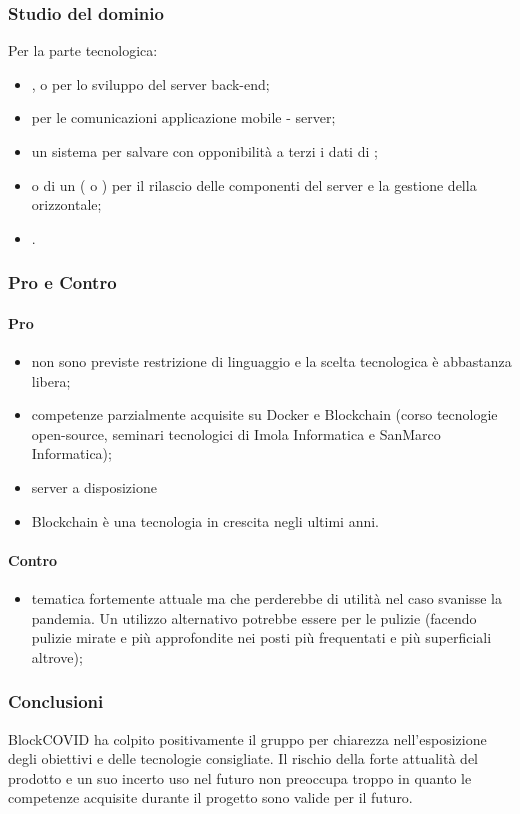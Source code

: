 \subsubsection{Studio del dominio}
Per la parte tecnologica:
\begin{itemize}
\item {},  o  per lo sviluppo del server back-end;
\item {}  per le comunicazioni applicazione mobile - server;
\item un sistema  per salvare con opponibilità a terzi i dati di ;
\item {} o di un  ( o ) per il rilascio delle componenti del server e la gestione della  orizzontale;
\item {}.
\end{itemize}
\subsubsection{Pro e Contro}
\paragraph*{Pro}
\begin{itemize}
	\item non sono previste restrizione di linguaggio e la scelta tecnologica è abbastanza libera;
	\item competenze parzialmente acquisite su Docker e Blockchain (corso tecnologie open-source, seminari tecnologici di Imola Informatica e SanMarco Informatica);
	\item server a disposizione 
	\item Blockchain è una tecnologia in crescita negli ultimi anni.
\end{itemize}
\paragraph*{Contro}
\begin{itemize}
	\item tematica fortemente attuale ma che perderebbe di utilità nel caso svanisse la pandemia. Un utilizzo alternativo potrebbe essere per le pulizie (facendo pulizie mirate e più approfondite nei posti più frequentati e più superficiali altrove);
\end{itemize}
\subsubsection{Conclusioni}
BlockCOVID ha colpito positivamente il gruppo per chiarezza nell'esposizione degli obiettivi e delle tecnologie consigliate. Il rischio della forte attualità del prodotto e un suo incerto uso nel futuro non preoccupa troppo in quanto le competenze acquisite durante il progetto sono valide per il futuro.

